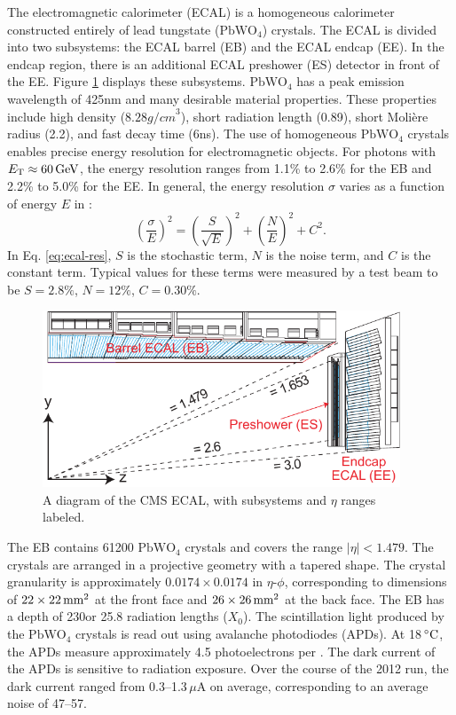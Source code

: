 \documentclass[12pt]{thesis}  %
\newcommand{\pbwo}{\ensuremath{\text{PbWO}_{4}}\xspace}
\newcommand{\muA}{\ensuremath{\,\mu\text{A}}\xspace}
\newcommand{\degC}{\ensuremath{\,\de\text{C}}\xspace}
\def\ET{\ensuremath{{E}_{\mathrm{T}}}}
\begin{document}
The electromagnetic calorimeter (ECAL) is a homogeneous calorimeter constructed entirely of lead tungstate (\pbwo) crystals. The ECAL is divided into two subsystems: the ECAL barrel (EB) and the ECAL endcap (EE). In the endcap region, there is an additional ECAL preshower (ES) detector in front of the EE. Figure \ref{fig:ecal-layout} displays these subsystems. \pbwo has a peak emission wavelength of 425\unit{nm} and many desirable material properties. These properties include high density ($8.28\unit{g/cm}^3$), short radiation length (0.89\cm), short Moli\`{e}re radius (2.2\cm), and fast decay time (6\unit{ns}). The use of homogeneous \pbwo crystals enables precise energy resolution for electromagnetic objects. For photons with $\ET \approx 60\GeV$, the energy resolution ranges from 1.1\% to 2.6\% for the EB and 2.2\% to 5.0\% for the EE. In general, the energy resolution $\sigma$ varies as a function of energy $E$ in \GeVns:
\begin{equation}
\label{eq:ecal-res} \left(\frac{\sigma}{E}\right)^{2} = \left(\frac{S}{\sqrt{E}}\right)^{2} + \left(\frac{N}{E}\right)^{2} + C^{2}.
\end{equation}
In Eq. \eqref{eq:ecal-res}, $S$ is the stochastic term, $N$ is the noise term, and $C$ is the constant term. Typical values for these terms were measured by a test beam to be $S=2.8\%$, $N=12\%$, $C=0.30\%$.

\begin{figure}[hbt]
\begin{center}
\includegraphics[width=0.95\textwidth]{figures/ECAL_transverse_section.pdf}
\caption{A diagram of the CMS ECAL, with subsystems and $\eta$ ranges labeled.}
\label{fig:ecal-layout}
\end{center}
\end{figure}

The EB contains 61200 \pbwo crystals and covers the range $|\eta|<1.479$. The crystals are arranged in a projective geometry with a tapered shape. The crystal granularity is approximately $0.0174\times0.0174$ in $\eta$-$\phi$, corresponding to dimensions of $22\times22\,\text{mm}^{2}$ at the front face and $26\times26\,\text{mm}^{2}$ at the back face. The EB has a depth of 230\mm or 25.8 radiation lengths ($X_{0}$). The scintillation light produced by the \pbwo crystals is read out using avalanche photodiodes (APDs). At 18\degC, the APDs measure approximately 4.5 photoelectrons per \MeVns. The dark current of the APDs is sensitive to radiation exposure. Over the course of the 2012 run, the dark current ranged from 0.3--1.3\muA on average, corresponding to an average noise of 47--57\MeV \cite{CMS:2013ecal}.
\end{document}
